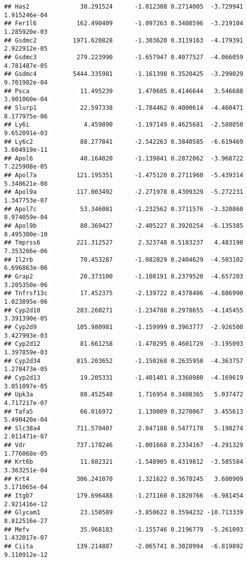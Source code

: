 \documentclass[
]{article}
\begin{document}
\begin{verbatim}
## Has2              30.291524      -1.012308 0.2714005  -3.729941 1.915246e-04
## Fer1l6           162.490409      -1.097263 0.3408596  -3.219104 1.285920e-03
## Gsdmc2          1971.620828      -1.303620 0.3119163  -4.179391 2.922912e-05
## Gsdmc3           279.223990      -1.657947 0.4077527  -4.066059 4.781487e-05
## Gsdmc4          5444.335981      -1.161398 0.3520425  -3.299029 9.701982e-04
## Psca              11.495239       1.470685 0.4146644   3.546688 3.901060e-04
## Slurp1            22.597338      -1.784462 0.4000614  -4.460471 8.177975e-06
## Ly6i               4.459890      -1.197149 0.4625681  -2.588050 9.652091e-03
## Ly6c2             88.277841      -2.542263 0.3840585  -6.619469 3.604919e-11
## Apol6             40.164020      -1.139841 0.2872062  -3.968722 7.225908e-05
## Apol7a           121.195351      -1.475120 0.2711960  -5.439314 5.348621e-08
## Apol9a           117.003492      -2.271978 0.4309329  -5.272231 1.347753e-07
## Apol7c            53.346081      -1.232562 0.3711576  -3.320860 8.974059e-04
## Apol9b            80.369427      -2.405227 0.3920254  -6.135385 8.495300e-10
## Tmprss6          221.312527       2.323748 0.5183237   4.483198 7.353266e-06
## Il2rb             70.453287      -1.082829 0.2404629  -4.503102 6.696863e-06
## Grap2             20.373100      -1.108191 0.2379520  -4.657203 3.205350e-06
## Tnfrsf13c         17.452375      -2.139722 0.4378406  -4.886990 1.023895e-06
## Cyp2d10          283.260271      -1.234788 0.2978655  -4.145455 3.391390e-05
## Cyp2d9           105.980981      -1.159999 0.3963777  -2.926500 3.427993e-03
## Cyp2d12           81.661258      -1.470295 0.4601729  -3.195093 1.397859e-03
## Cyp2d34          815.203652      -1.150268 0.2635958  -4.363757 1.278473e-05
## Cyp2d13           19.205331      -1.401401 0.3360980  -4.169619 3.051097e-05
## Upk3a             80.452548       1.716954 0.3408365   5.037472 4.717217e-07
## Tafa5             66.016972       1.130009 0.3270067   3.455613 5.490420e-04
## Slc38a4          711.570407       2.847188 0.5477178   5.198274 2.011471e-07
## Vdr              737.178246      -1.001668 0.2334167  -4.291329 1.776068e-05
## Krt6b             11.882321      -1.548905 0.4319812  -3.585584 3.363251e-04
## Krt4             306.241070       1.321622 0.3670245   3.600909 3.171065e-04
## Itgb7            179.696488      -1.271160 0.1820766  -6.981454 2.921416e-12
## Glycam1           23.150589      -3.850622 0.3594232 -10.713339 8.812516e-27
## Mefv              35.968183      -1.155746 0.2196779  -5.261093 1.432017e-07
## Ciita            139.214887      -2.065741 0.3028994  -6.819892 9.110912e-12

\end{verbatim}
\end{document}
